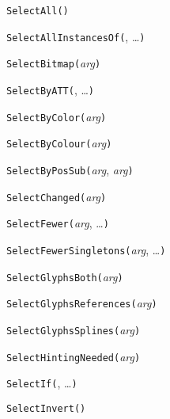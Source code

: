\noindent\texttt{SelectAll(}\texttt{)}


\noindent\texttt{SelectAllInstancesOf(}, \ldots\texttt{)}


\noindent\texttt{SelectBitmap(}\textit{arg}\texttt{)}


\noindent\texttt{SelectByATT(}, \ldots\texttt{)}


\noindent\texttt{SelectByColor(}\textit{arg}\texttt{)}


\noindent\texttt{SelectByColour(}\textit{arg}\texttt{)}


\noindent\texttt{SelectByPosSub(}\textit{arg}, \textit{arg}\texttt{)}


\noindent\texttt{SelectChanged(}\textit{arg}\texttt{)}


\noindent\texttt{SelectFewer(}\textit{arg}, \ldots\texttt{)}


\noindent\texttt{SelectFewerSingletons(}\textit{arg}, \ldots\texttt{)}


\noindent\texttt{SelectGlyphsBoth(}\textit{arg}\texttt{)}


\noindent\texttt{SelectGlyphsReferences(}\textit{arg}\texttt{)}


\noindent\texttt{SelectGlyphsSplines(}\textit{arg}\texttt{)}


\noindent\texttt{SelectHintingNeeded(}\textit{arg}\texttt{)}


\noindent\texttt{SelectIf(}, \ldots\texttt{)}


\noindent\texttt{SelectInvert(}\texttt{)}


